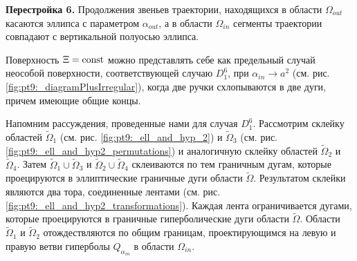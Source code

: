 \textbf{Перестройка 6.} 
Продолжения звеньев траектории, находящихся в области $\Omega_{out}$ касаются эллипса с параметром $\alpha_{out}$, а в области $\Omega_{in}$ сегменты траектории совпадают с вертикальной полуосью эллипса.

Поверхность $\Xi = \mathrm{const}$ можно представлять себе как предельный случай неособой поверхности, соответствующей случаю $D_1^6$, при $\alpha_{in} \to a^2$ (см. рис. \ref{fig:pt9:_diagramPlusIrregular}), когда две ручки схлопываются в две дуги, причем имеющие общие концы. 

Напомним рассуждения, проведенные нами для случая $D_1^6$. Рассмотрим склейку областей $\widetilde{\Omega}_1$ (см. рис. \ref{fig:pt9:_ell_and_hyp_2}) и $\widetilde{\Omega}_3$ (см. рис. \ref{fig:pt9:_ell_and_hyp2_permutations}) и аналогичную склейку областей $\widetilde{\Omega}_2$ и $\widetilde{\Omega}_4$.
Затем $\widetilde{\Omega}_1 \cup \widetilde{\Omega}_3$ и $\widetilde{\Omega}_2 \cup \widetilde{\Omega}_4$ склеиваются по тем граничным дугам, которые проецируются в эллиптические граничные дуги области $\widetilde{\Omega}$. Результатом склейки являются два тора, соединенные лентами (см. рис.  \ref{fig:pt9:_ell_and_hyp2_transformations}). Каждая лента ограничивается дугами, которые проецируются в граничные гиперболические дуги области $\widetilde{\Omega}$. 
Области $\widetilde{\Omega}_1$ и $\widetilde{\Omega}_2$ отождествляются по общим границам, проектирующимся на левую и правую ветви гиперболы $Q_{\alpha_{in}}$ в области $\Omega_{in}$. 

